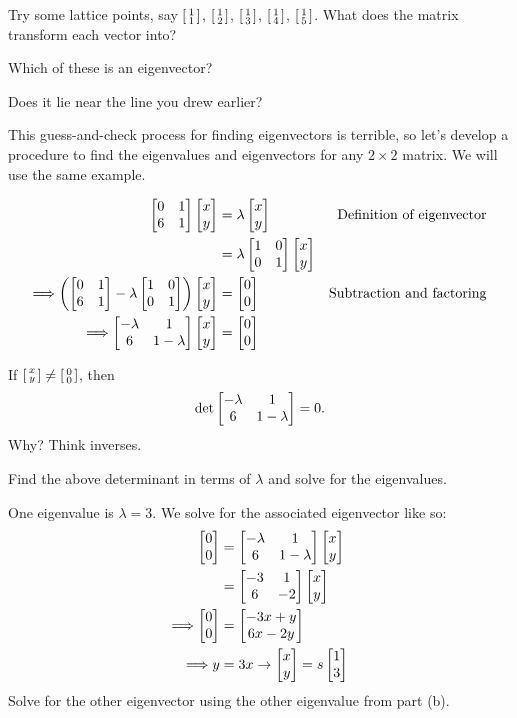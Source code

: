 \documentclass[../gatm_answers.tex]{subfiles}
\begin{document}
\begin{inner_problem}
\item Try some lattice points, say $\left[\begin{smallmatrix} 1 \\ 1 \end{smallmatrix}\right]$, $\left[\begin{smallmatrix} 1 \\ 2 \end{smallmatrix}\right]$, $\left[\begin{smallmatrix} 1 \\ 3 \end{smallmatrix}\right]$, $\left[\begin{smallmatrix} 1 \\ 4 \end{smallmatrix}\right]$, $\left[\begin{smallmatrix} 1 \\ 5 \end{smallmatrix}\right]$. What does the matrix transform each vector into?
\end{inner_problem}

\begin{inner_problem}
\item Which of these is an eigenvector?
\end{inner_problem}

\begin{inner_problem}
\item Does it lie near the line you drew earlier?
\end{inner_problem}

\begin{outer_problem}
\item This guess-and-check process for finding eigenvectors is terrible, so let's develop a procedure to find the eigenvalues and eigenvectors for any $2\times 2$ matrix. We will use the same example.

\begin{align*}
\begin{bmatrix} 0 & 1 \\ 6 & 1 \end{bmatrix}\begin{bmatrix} x \\ y \end{bmatrix} &= \lambda\begin{bmatrix} x \\ y \end{bmatrix} & \text{Definition of eigenvector} \\
&= \lambda\begin{bmatrix} 1 & 0 \\ 0 & 1 \end{bmatrix}\begin{bmatrix} x \\ y \end{bmatrix} \\
\Longrightarrow \left(\begin{bmatrix} 0 & 1 \\ 6 & 1 \end{bmatrix}-\lambda\begin{bmatrix} 1 & 0 \\ 0 & 1 \end{bmatrix}\right)\begin{bmatrix} x \\ y \end{bmatrix}&=\begin{bmatrix} 0 \\ 0 \end{bmatrix} & \text{Subtraction and factoring} \\
\Longrightarrow \begin{bmatrix} -\lambda & 1 \\ 6 & 1-\lambda \end{bmatrix}\begin{bmatrix} x \\ y \end{bmatrix} &= \begin{bmatrix} 0 \\ 0 \end{bmatrix}
\end{align*}
\end{outer_problem}

\begin{inner_problem}[start=1]
\item If $\left[\begin{smallmatrix} x \\ y \end{smallmatrix}\right]\neq \left[\begin{smallmatrix} 0 \\ 0 \end{smallmatrix}\right]$, then $$\det \begin{bmatrix} -\lambda & 1 \\ 6 & 1-\lambda \end{bmatrix}=0.$$ Why? Think inverses.
\end{inner_problem}

\begin{inner_problem}
\item Find the above determinant in terms of $\lambda$ and solve for the eigenvalues.
\end{inner_problem}

\begin{inner_problem}
\item One eigenvalue is $\lambda=3$. We solve for the associated eigenvector like so:
\begin{align*}
\begin{bmatrix} 0 \\ 0 \end{bmatrix} &= \begin{bmatrix} -\lambda & 1 \\ 6 & 1-\lambda \end{bmatrix}\begin{bmatrix} x \\ y \end{bmatrix} \\
&= \begin{bmatrix} -3 & 1 \\ 6 & -2 \end{bmatrix}\begin{bmatrix} x \\ y \end{bmatrix} \\
\Longrightarrow \begin{bmatrix} 0 \\ 0 \end{bmatrix} &= \begin{bmatrix} -3x+y \\ 6x-2y \end{bmatrix} \\
\Longrightarrow y&=3x \rightarrow \begin{bmatrix} x \\ y \end{bmatrix}=s\begin{bmatrix} 1 \\ 3 \end{bmatrix}
\end{align*}
Solve for the other eigenvector using the other eigenvalue from part (b).
\end{inner_problem}
\end{document}

